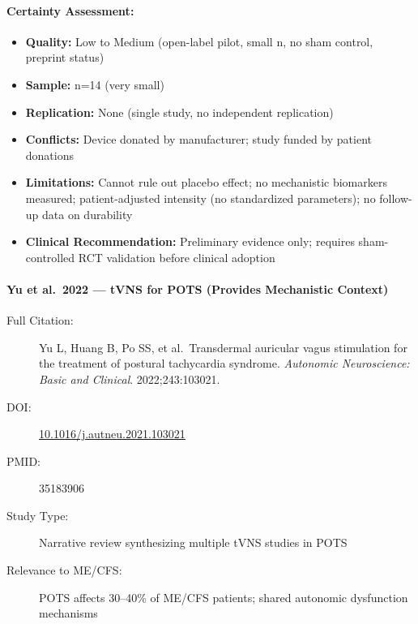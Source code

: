 \paragraph{Certainty Assessment:}
\begin{itemize}
    \item \textbf{Quality:} Low to Medium (open-label pilot, small n, no sham control, preprint status)
    \item \textbf{Sample:} n=14 (very small)
    \item \textbf{Replication:} None (single study, no independent replication)
    \item \textbf{Conflicts:} Device donated by manufacturer; study funded by patient donations
    \item \textbf{Limitations:} Cannot rule out placebo effect; no mechanistic biomarkers measured; patient-adjusted intensity (no standardized parameters); no follow-up data on durability
    \item \textbf{Clinical Recommendation:} Preliminary evidence only; requires sham-controlled RCT validation before clinical adoption
\end{itemize}

\paragraph{Yu et al.\ 2022 --- tVNS for POTS (Provides Mechanistic Context)}

\begin{description}
    \item[Full Citation:] Yu L, Huang B, Po SS, et al.\ Transdermal auricular vagus stimulation for the treatment of postural tachycardia syndrome. \textit{Autonomic Neuroscience: Basic and Clinical}. 2022;243:103021.
    \item[DOI:] \href{https://doi.org/10.1016/j.autneu.2021.103021}{10.1016/j.autneu.2021.103021}
    \item[PMID:] 35183906
    \item[Study Type:] Narrative review synthesizing multiple tVNS studies in POTS
    \item[Relevance to ME/CFS:] POTS affects 30--40\% of ME/CFS patients; shared autonomic dysfunction mechanisms
\end{description}

